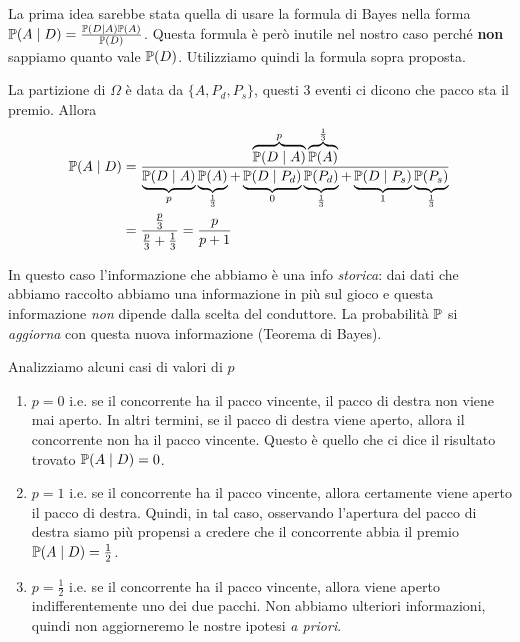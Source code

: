 \begin{enumerate}
	\begin{oss}
		La prima idea sarebbe stata quella di usare la formula di Bayes nella forma $\mathbb{P}( A\mid D) =\frac{\mathbb{P}( D\mid A)\mathbb{P}( A)}{\mathbb{P}( D)}$. Questa formula è però inutile nel nostro caso perché \textbf{non} sappiamo quanto vale $\mathbb{P}( D)$. Utilizziamo quindi la formula sopra proposta.
	\end{oss}

	La partizione di $\Omega $ è data da $\{A,P_{d} ,P_{s}\}$, questi $3$ eventi ci dicono che pacco sta il premio. Allora
	\begin{align*}
		\mathbb{P}( A\mid D) & =\frac{\overbrace{\mathbb{P}( D\mid A)}^{p}\overbrace{\mathbb{P}( A)}^{\frac{1}{3}}}{\underbrace{\mathbb{P}( D\mid A)}_{p}\underbrace{\mathbb{P}( A)}_{\frac{1}{3}} +\underbrace{\mathbb{P}( D\mid P_{d})}_{0}\underbrace{\mathbb{P}( P_{d})}_{\frac{1}{3}} +\underbrace{\mathbb{P}( D\mid P_{s})}_{1}\underbrace{\mathbb{P}( P_{s})}_{\frac{1}{3}}}\\
		 & =\frac{\frac{p}{3}}{\frac{p}{3} +\frac{1}{3}} =\frac{p}{p+1}
	\end{align*}

	\begin{oss}
		In questo caso l'informazione che abbiamo è una info \textit{storica}: dai dati che abbiamo raccolto abbiamo una informazione in più sul gioco e questa informazione \textit{non} dipende dalla scelta del conduttore. La probabilità $\mathbb{P}$ si \textit{aggiorna} con questa nuova informazione (Teorema di Bayes).
	\end{oss}

	Analizziamo alcuni casi di valori di $p$
	\begin{enumerate}
		\item $\boxed{p=0}$ i.e. se il concorrente ha il pacco vincente, il pacco di destra non viene mai aperto. In altri termini, se il pacco di destra viene aperto, allora il concorrente non ha il pacco vincente. Questo è quello che ci dice il risultato trovato $\mathbb{P}( A\mid D) =0$.
		\item $\boxed{p=1}$ i.e. se il concorrente ha il pacco vincente, allora certamente viene aperto il pacco di destra. Quindi, in tal caso, osservando l'apertura del pacco di destra siamo più propensi a credere che il concorrente abbia il premio $\mathbb{P}( A\mid D) =\frac{1}{2}$.
		\item $\boxed{p=\frac{1}{2}}$ i.e. se il concorrente ha il pacco vincente, allora viene aperto indifferentemente uno dei due pacchi. Non abbiamo ulteriori informazioni, quindi non aggiorneremo le nostre ipotesi \textit{a priori}.
	\end{enumerate}
\end{enumerate}

